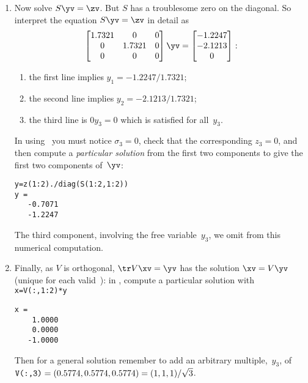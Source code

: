 \begin{example}
\begin{solution}
\begin{enumerate}
\item Now solve \(S\yv=\zv\).
But \(S\) has a troublesome zero on the diagonal. 
So interpret the equation \(S\yv=\zv\) in detail as
\begin{equation*}
\begin{bmatrix} 1.7321&0&0
\\0&1.7321&0
\\0&0&0 \end{bmatrix}\yv=\begin{bmatrix} 
   -1.2247\\-2.1213\\0
\end{bmatrix}:
\end{equation*}
\begin{enumerate}
\item the first line implies \(y_1=-1.2247/1.7321\);
\item the second line implies \(y_2=-2.1213/1.7321\);
\item the third line is \(0y_3=0\) which is satisfied for all~\(y_3\).
\end{enumerate}
In using \script\ you must notice \(\sigma_3=0\), check that the corresponding \(z_3=0\), and then compute a \emph{particular solution} from the first two components to give the first two components of~\(\yv\):
\begin{verbatim}
y=z(1:2)./diag(S(1:2,1:2))
y =
   -0.7071
   -1.2247
\end{verbatim}
The third component, involving the free variable~\(y_3\), we omit from this numerical computation.

\item Finally, as \(V\) is orthogonal, \(\tr V\xv=\yv\) has the solution \(\xv=V\yv\) (unique for each valid~\yv):
in \script, compute a particular solution with \verb|x=V(:,1:2)*y| 
\begin{verbatim}
x =
    1.0000
    0.0000
   -1.0000
\end{verbatim}
Then for a general solution remember to add an arbitrary multiple,~\(y_3\), of \(\verb|V(:,3)|=(0.5774,0.5774,0.5774)=(1,1,1)/\sqrt3\).
\end{enumerate}


\end{solution}
\end{example}
